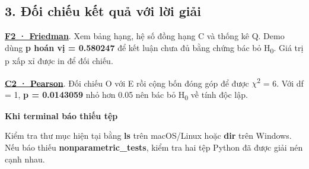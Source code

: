\documentclass[11pt,a4paper]{article}
\newcommand{\ResultBox}[2]{%
  \medskip\noindent
  \colorbox{wash}{\parbox{\dimexpr\linewidth-2\fboxsep\relax}{%
    \textbf{\textcolor{accent}{#1}}\par #2}}%
  \par\medskip
}
\begin{document}
\subsection*{3. Đối chiếu kết quả với lời giải}

\hyperref[sec:f2]{\textbf{F2 · Friedman}}. Xem bảng hạng, hệ số đồng hạng C và thống kê Q. Demo dùng
\textbf{p hoán vị = 0.580247} để kết luận chưa đủ bằng chứng bác bỏ H\textsubscript{0}. Giá trị p xấp xỉ
được in để đối chiếu.

\hyperref[sec:c2]{\textbf{C2 · Pearson}}. Đối chiếu O với E rồi cộng bốn đóng góp để được
\ensuremath{\chi}\textsuperscript{2} = 6. Với df = 1, \textbf{p = 0.0143059} nhỏ hơn 0.05 nên bác bỏ
H\textsubscript{0} về tính độc lập.

\ResultBox{Khi terminal báo thiếu tệp}{Kiểm tra thư mục hiện tại bằng \textbf{ls} trên macOS/Linux hoặc \textbf{dir} trên Windows. Nếu báo thiếu \textbf{nonparametric\_tests}, kiểm tra hai tệp Python đã được giải nén cạnh nhau.}

\clearpage

\renewcommand{\refname}{Tài liệu tham khảo}

\end{document}
